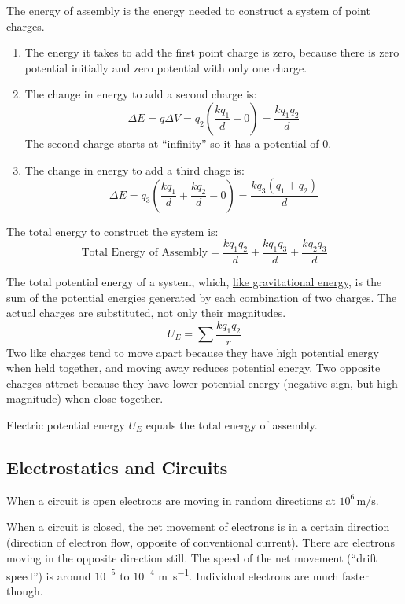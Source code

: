 \documentclass{article}
\newcommand{\theorem}[2]{\begin{tcolorbox}[title={#1},colback=blue!5!white,colframe=blue!75!black,parbox=false] #2 \end{tcolorbox}}
\begin{document}
The energy of assembly is the energy needed to construct a system of point charges.
\begin{enumerate}
	\item The energy it takes to add the first point charge is zero, because there is zero potential initially and zero potential with only one charge.
	\item The change in energy to add a second charge is:
		\begin{equation*}
		    \Delta E=q\Delta V=q_2 \left( \frac{kq_1}{d}-0 \right)=\frac{kq_1q_2}{d}
		\end{equation*}
		The second charge starts at ``infinity'' so it has a potential of $0$.
	\item The change in energy to add a third chage is:
		\begin{equation*}
		    \Delta E=q_3 \left( \frac{kq_1}{d}+\frac{kq_2}{d}-0 \right)=\frac{kq_3(q_1+q_2)}{d}
		\end{equation*}
\end{enumerate}
The total energy to construct the system is:
\begin{equation*}
	\text{Total Energy of Assembly}=\frac{kq_1q_2}{d}+\frac{kq_1q_3}{d}+\frac{kq_2q_3}{d}
\end{equation*}
\theorem{Electric potential energy of a system}{
	The total potential energy of a system, which, \ul{like gravitational energy}, is the sum of the potential energies generated by each combination of two charges. The actual charges are substituted, not only their magnitudes.
	\begin{equation*}
		U_E=\sum \frac{kq_1q_2}{r}
	\end{equation*}
	Two like charges tend to move apart because they have high potential energy when held together, and moving away reduces potential energy. Two opposite charges attract because they have lower potential energy (negative sign, but high magnitude) when close together.

	Electric potential energy $U_E$ equals the total energy of assembly.
}

\subsection{Electrostatics and Circuits}

When a circuit is open electrons are moving in random directions at $10^6\,\si{\meter/\second}$.

When a circuit is closed, the \ul{net movement} of electrons is in a certain direction (direction of electron flow, opposite of conventional current). There are electrons moving in the opposite direction still. The speed of the net movement (``drift speed'') is around $10^{-5}$ to $10^{-4}$ \si{\meter\per\second}. Individual electrons are much faster though.
\end{document}
